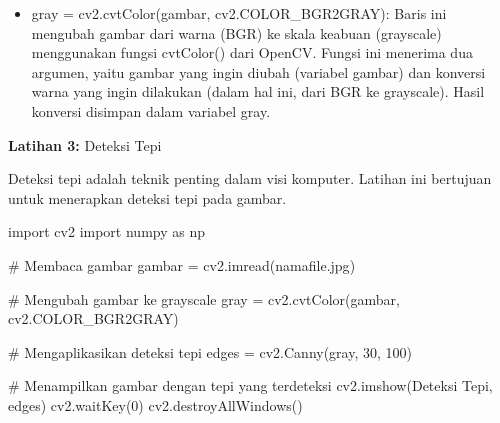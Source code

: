 \documentclass[
  letterpaper,
  DIV=11,
  numbers=noendperiod]{scrreprt}
\newenvironment{Shaded}{\begin{snugshade}}{\end{snugshade}}
\newcommand{\CommentTok}[1]{\textcolor[rgb]{0.37,0.37,0.37}{#1}}
\newcommand{\DecValTok}[1]{\textcolor[rgb]{0.68,0.00,0.00}{#1}}
\newcommand{\ImportTok}[1]{\textcolor[rgb]{0.00,0.46,0.62}{#1}}
\newcommand{\NormalTok}[1]{\textcolor[rgb]{0.00,0.23,0.31}{#1}}
\newcommand{\OperatorTok}[1]{\textcolor[rgb]{0.37,0.37,0.37}{#1}}
\newcommand{\StringTok}[1]{\textcolor[rgb]{0.13,0.47,0.30}{#1}}
\providecommand{\tightlist}{%
  \setlength{\itemsep}{0pt}\setlength{\parskip}{0pt}}\usepackage{longtable,booktabs,array}
\begin{document}
\begin{tcolorbox}[enhanced jigsaw, opacityback=0, colbacktitle=quarto-callout-tip-color!10!white, breakable, titlerule=0mm, left=2mm, toptitle=1mm, rightrule=.15mm, leftrule=.75mm, colback=white, opacitybacktitle=0.6, arc=.35mm, toprule=.15mm, coltitle=black, colframe=quarto-callout-tip-color-frame, bottomtitle=1mm, title=\textcolor{quarto-callout-tip-color}{\faLightbulb}\hspace{0.5em}{Penjelasan Kode}, bottomrule=.15mm]

\begin{itemize}
\tightlist
\item
  gray = cv2.cvtColor(gambar, cv2.COLOR\_BGR2GRAY): Baris ini mengubah
  gambar dari warna (BGR) ke skala keabuan (grayscale) menggunakan
  fungsi cvtColor() dari OpenCV. Fungsi ini menerima dua argumen, yaitu
  gambar yang ingin diubah (variabel gambar) dan konversi warna yang
  ingin dilakukan (dalam hal ini, dari BGR ke grayscale). Hasil konversi
  disimpan dalam variabel gray.\\
\end{itemize}

\end{tcolorbox}

\textbf{Latihan 3:} Deteksi Tepi

Deteksi tepi adalah teknik penting dalam visi komputer. Latihan ini
bertujuan untuk menerapkan deteksi tepi pada gambar.

\begin{Shaded}
\begin{Highlighting}[]
\ImportTok{import}\NormalTok{ cv2}
\ImportTok{import}\NormalTok{ numpy }\ImportTok{as}\NormalTok{ np}

\CommentTok{\# Membaca gambar}
\NormalTok{gambar }\OperatorTok{=}\NormalTok{ cv2.imread(}\StringTok{\textquotesingle{}namafile.jpg\textquotesingle{}}\NormalTok{)}

\CommentTok{\# Mengubah gambar ke grayscale}
\NormalTok{gray }\OperatorTok{=}\NormalTok{ cv2.cvtColor(gambar, cv2.COLOR\_BGR2GRAY)}

\CommentTok{\# Mengaplikasikan deteksi tepi}
\NormalTok{edges }\OperatorTok{=}\NormalTok{ cv2.Canny(gray, }\DecValTok{30}\NormalTok{, }\DecValTok{100}\NormalTok{)}

\CommentTok{\# Menampilkan gambar dengan tepi yang terdeteksi}
\NormalTok{cv2.imshow(}\StringTok{\textquotesingle{}Deteksi Tepi\textquotesingle{}}\NormalTok{, edges)}
\NormalTok{cv2.waitKey(}\DecValTok{0}\NormalTok{)}
\NormalTok{cv2.destroyAllWindows()}
\end{Highlighting}
\end{Shaded}
\end{document}
